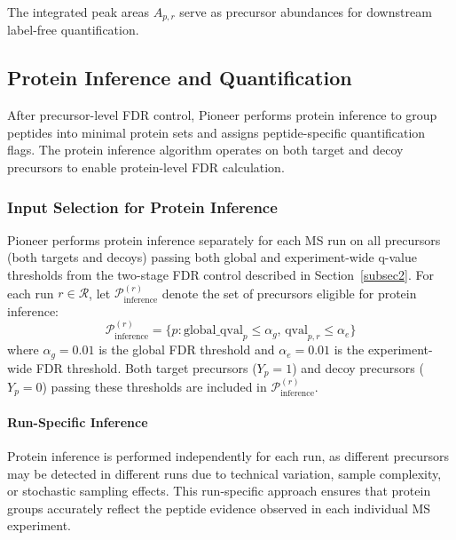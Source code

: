 \documentclass[pdflatex,sn-nature]{sn-jnl}
\begin{document}
The integrated peak areas $A_{p,r}$ serve as precursor abundances for downstream label-free quantification.

\subsection{Protein Inference and Quantification}\label{subsec:protein_inference}

After precursor-level FDR control, Pioneer performs protein inference to group peptides into minimal protein sets and assigns peptide-specific quantification flags. The protein inference algorithm operates on both target and decoy precursors to enable protein-level FDR calculation.

\subsubsection{Input Selection for Protein Inference}

Pioneer performs protein inference separately for each MS run on all precursors (both targets and decoys) passing both global and experiment-wide q-value thresholds from the two-stage FDR control described in Section~\ref{subsec2}. For each run $r \in \mathcal{R}$, let $\mathcal{P}_{\text{inference}}^{(r)}$ denote the set of precursors eligible for protein inference:
\begin{equation}
\mathcal{P}_{\text{inference}}^{(r)} = \{p : \text{global\_qval}_p \leq \alpha_g, \, \text{qval}_{p,r} \leq \alpha_e\}
\end{equation}
where $\alpha_g = 0.01$ is the global FDR threshold and $\alpha_e = 0.01$ is the experiment-wide FDR threshold. Both target precursors ($Y_p = 1$) and decoy precursors ($Y_p = 0$) passing these thresholds are included in $\mathcal{P}_{\text{inference}}^{(r)}$.

\paragraph{Run-Specific Inference} Protein inference is performed independently for each run, as different precursors may be detected in different runs due to technical variation, sample complexity, or stochastic sampling effects. This run-specific approach ensures that protein groups accurately reflect the peptide evidence observed in each individual MS experiment.
\end{document}
